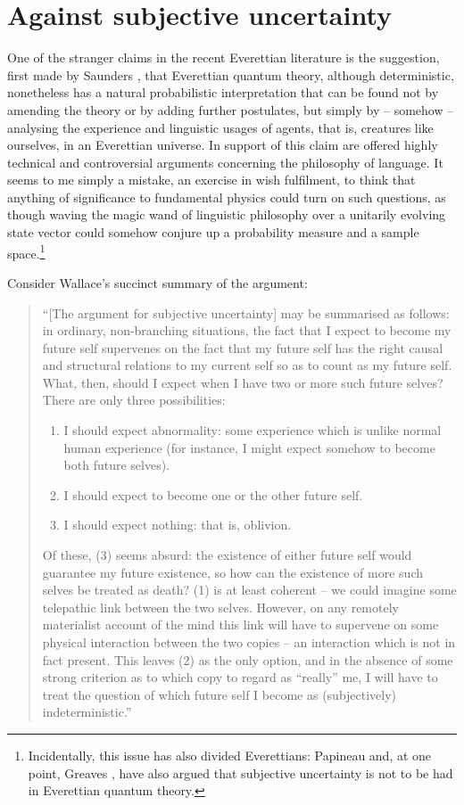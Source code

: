 \documentclass[aps,
pra,epsfig]{revtex4}
\begin{document}
\section{Against subjective uncertainty}

One of the stranger claims in the recent Everettian literature is the
suggestion, first made by Saunders \cite{saundersprob, 
saundersvol, saunderswallace, wallaceepiq}, 
that Everettian quantum
theory, although deterministic, nonetheless has a natural
probabilistic interpretation that can be found not by amending the theory or
by adding further postulates, but simply by -- somehow -- analysing the
experience and linguistic usages of agents, that is, creatures 
like ourselves, in an
Everettian universe.  In support of this claim are offered highly
technical and controversial arguments concerning the philosophy of language.
It seems to me simply a mistake, an exercise in wish fulfilment, to 
think that anything of significance to fundamental physics could turn on such 
questions, as though waving the magic wand of linguistic philosophy over
a unitarily evolving state vector could somehow conjure up 
a probability measure and a sample space.\footnote{Incidentally,
this issue has also divided Everettians: Papineau\cite{papineausu} 
and, at one point, Greaves \cite{greavessu},
have also argued that subjective uncertainty is not to be had in 
Everettian quantum theory.}   

Consider Wallace's succinct summary\cite{wallaceepiq} of the argument: 

\begin{quotation}
``[The argument for subjective uncertainty] may be summarised as
follows: in ordinary, non-branching situations, the fact that I expect to become
my future self supervenes on the fact that my future self has 
the right causal and
structural relations to my current self so as to count as my future self. What,
then, should I expect when I have two or more such future selves? There are
only three possibilities:
\begin{enumerate}
\item I should expect 
abnormality: some experience which is unlike normal human
experience (for instance, I might expect somehow to become both
future selves).
\item I should expect to become one or the other future self.
\item I should expect nothing: that is, oblivion.
\end{enumerate}

Of these, (3) seems absurd: the existence of either future self would guarantee
my future existence, so how can the existence of more such selves be treated
as death? (1) is at least coherent -- we could imagine some telepathic link
between the two selves. However, on any remotely materialist account of the
mind this link will have to supervene on some physical interaction between the
two copies -- an interaction which is not in fact present. This leaves (2) as the
only option, and in the absence of some strong criterion as to which copy to
regard as ``really'' me, I will have to treat 
the question of which future self I
become as (subjectively) indeterministic.''
\end{quotation}
\end{document}
